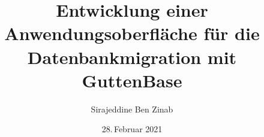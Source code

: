 \makeatletter


\author{Sirajeddine Ben Zinab}

\title{Entwicklung einer Anwendungsoberfläche für die Datenbankmigration mit GuttenBase}
\subtitle{}

\date{28.\,Februar 2021}





\onehalfspacing

\makeatother
\endinput
